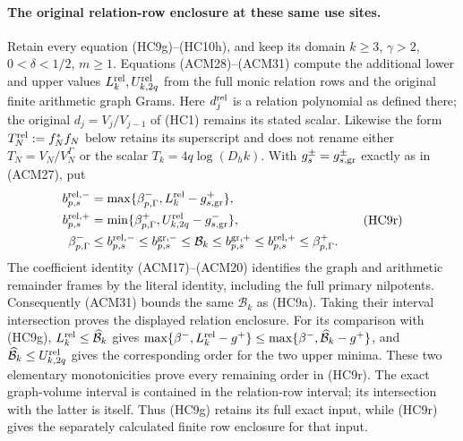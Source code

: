 \paragraph{The original relation-row enclosure at these same use sites.}
Retain every equation (HC9g)--(HC10h), and keep its domain
$k\geq3$, $\gamma>2$, $0<\delta<1/2$, $m\geq1$.
Equations (ACM28)--(ACM31) compute the additional lower and upper
values $L_k^{\rm rel},U_{k,2q}^{\rm rel}$ from the full monic
relation rows and the original finite arithmetic graph Grams.
Here $d_j^{\rm rel}$ is a relation polynomial as defined there;
the original $d_j=V_j/V_{j-1}$ of (HC1) remains its stated scalar.
Likewise the form $T_N^{\rm rel}:=f_N^*f_N$ below retains its
superscript and does not rename either $T_N=V_N/V_N^\Gamma$ or
the scalar $T_k=4q\log(D_hk)$. With
$g_s^{\pm}=g_{s,\rm gr}^{\pm}$ exactly as in (ACM27), put
\[
\begin{aligned}
 b_{p,s}^{\rm rel,-}
   &=\max\{\beta_{p,\Gamma}^-,L_k^{\rm rel}-g_{s,\rm gr}^+\},\\
 b_{p,s}^{\rm rel,+}
   &=\min\{\beta_{p,\Gamma}^+,U_{k,2q}^{\rm rel}-g_{s,\rm gr}^-\},\\
 \beta_{p,\Gamma}^-&\leq b_{p,s}^{\rm rel,-}
 \leq b_{p,s}^{\rm gr,-}\leq\mathcal B_k
 \leq b_{p,s}^{\rm gr,+}\leq b_{p,s}^{\rm rel,+}
 \leq\beta_{p,\Gamma}^+.
\end{aligned}\tag{HC9r}
\]
The coefficient identity (ACM17)--(ACM20) identifies the graph
and arithmetic remainder frames by the literal identity, including
the full primary nilpotents. Consequently (ACM31) bounds the same
$\mathcal B_k$ as (HC9a). Taking their interval intersection proves
the displayed relation enclosure. For its comparison with (HC9g),
$L_k^{\rm rel}\leq\widehat{\mathcal B}_k$ gives
$\max\{\beta^-,L_k^{\rm rel}-g^+\}
\leq\max\{\beta^-,\widehat{\mathcal B}_k-g^+\}$, and
$\widehat{\mathcal B}_k\leq U_{k,2q}^{\rm rel}$ gives the
corresponding order for the two upper minima. These two elementary
monotonicities prove every remaining order in (HC9r). The exact
graph-volume interval is contained in the relation-row interval;
its intersection with the latter is itself. Thus (HC9g) retains its
full exact input, while (HC9r) gives the separately calculated
finite row enclosure for that input.


